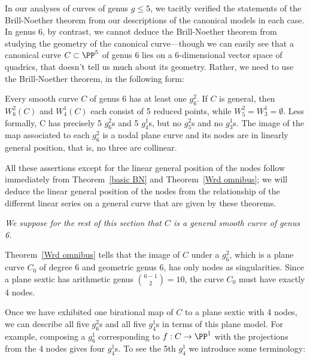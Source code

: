 In our analyses of curves of genus $g \leq 5$, we tacitly verified the statements of the Brill-Noether theorem from our descriptions of the canonical models in each case. In genus 6, by contrast, we cannot  deduce the Brill-Noether theorem from studying the geometry of the canonical curve---though we can easily see that a canonical curve $C \subset \PP^5$ of genus 6 lies on a 6-dimensional vector space of quadrics, that doesn't tell us much about its geometry. Rather, we need to use the Brill-Noether theorem, in the following form:

\begin{theorem}\label{BN consequences}
Every smooth curve $C$ of genus 6 has at least one $g^{2}_{6}$. If $C$ is general, then
$W^{2}_{6}(C)$ and $W^{1}_{4}(C)$ each consist of 5 reduced points, while $W^{2}_{5} = W^{1}_{3} = \emptyset$.  Less formally, C has precisely 5 $g^{2}_{6}$s and 5 $g^{1}_{4}$s, but no $g^{2}_{5}$s and no $g^{1}_{3}$s. The image of the map associated to each $g^{2}_{6}$ is a nodal plane curve and its nodes are in linearly general position, that is, no three are collinear.
\end{theorem}

All these assertions except for the linear general position of the nodes follow immediately from 
Theorem~\ref{basic BN} and
Theorem~\ref{Wrd omnibus}; we will deduce the linear general position of the nodes from the relationship of the different
linear series on a general curve that are given by these theorems.


\emph{We suppose for the rest of this section that $C$ is a general smooth curve of genus 6.}

Theorem~\ref{Wrd omnibus} tells that the image of $C$ under a $g^{2}_{6}$, which is a plane curve $C_{0}$ of degree 6 and
geometric genus 6, has only nodes
as singularities. Since a plane sextic has arithmetic genus $\binom{6-1}{2} = 10$, the curve $C_{0}$
must have exactly 4 nodes.

Once we have exhibited one birational map of $C$ to a plane sextic with 4 nodes, we can describe all five $g^2_6$s and all five $g^1_4$s in terms of this plane model. For example, composing a $g^1_6$ corresponding to $f: C\to \PP^1$ with the projections from the 4 nodes gives four $g^1_4$s. To see the 5th $g^{1}_{4}$ we introduce some terminology:

